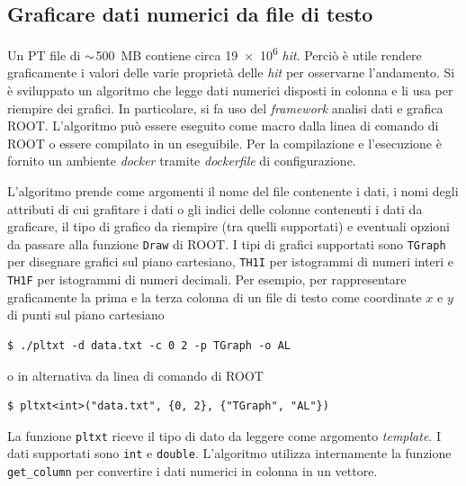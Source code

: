 \documentclass[../main.tex]{subfiles}
\begin{document}
\subsection{Graficare dati numerici da file di testo}
Un PT file di $\small\sim$\SI{500}{MB} contiene circa \SI{19e6}{} \emph{hit}. Perciò è utile rendere graficamente i valori delle varie proprietà delle \emph{hit} per osservarne l'andamento. Si è sviluppato un algoritmo che legge dati numerici disposti in colonna e li usa per riempire dei grafici. In particolare, si fa uso del \emph{framework} analisi dati e grafica ROOT. L'algoritmo può essere eseguito come macro dalla linea di comando di ROOT o essere compilato in un eseguibile. Per la compilazione e l'esecuzione è fornito un ambiente \emph{docker} tramite \emph{dockerfile} di configurazione.

L'algoritmo prende come argomenti il nome del file contenente i dati, i nomi degli attributi di cui grafitare i dati o gli indici delle colonne contenenti i dati da graficare, il tipo di grafico da riempire (tra quelli supportati) e eventuali opzioni da passare alla funzione \texttt{Draw} di ROOT. I tipi di grafici supportati sono \texttt{TGraph} per disegnare grafici sul piano cartesiano, \texttt{TH1I} per istogrammi di numeri interi e \texttt{TH1F} per istogrammi di numeri decimali.
Per esempio, per rappresentare graficamente la prima e la terza colonna di un file di testo come coordinate $x$ e $y$ di punti sul piano cartesiano
\begin{lstlisting}[frame=none]
$ ./pltxt -d data.txt -c 0 2 -p TGraph -o AL
\end{lstlisting}
o in alternativa da linea di comando di ROOT
\begin{lstlisting}[frame=none]
$ pltxt<int>("data.txt", {0, 2}, {"TGraph", "AL"})
\end{lstlisting}
La funzione \texttt{pltxt} riceve il tipo di dato da leggere come argomento \emph{template}. I dati supportati sono \texttt{int} e \texttt{double}. 
L'algoritmo utilizza internamente la funzione \texttt{get\_column} per convertire i dati numerici in colonna in un vettore.
\end{document}
